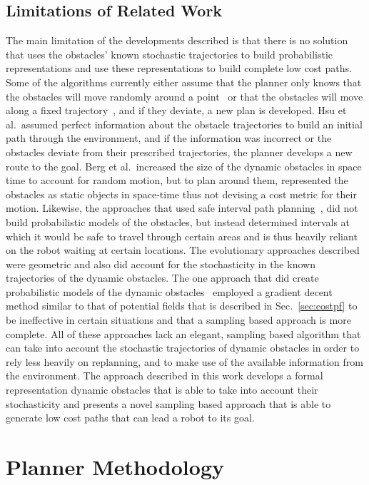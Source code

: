 \documentclass[letterpaper, 10pt, conference]{ieeeconf}
\begin{document}
\subsection{Limitations of Related Work}

The main limitation of the developments described is that there is no solution
that uses the obstacles' known stochastic trajectories to build probabilistic
representations and use these representations to build complete low cost paths.
Some of the algorithms currently either assume that the planner only knows that
the obstacles will move randomly around a point~\cite{rodriguez2007framework}
or that the obstacles will move along a fixed
trajectory~\cite{hsu2002randomized}, and if they deviate, a new plan is
developed. Hsu et al.\ assumed perfect information about the obstacle
trajectories to build an initial path through the environment, and if the
information was incorrect or the obstacles deviate from their prescribed
trajectories, the planner develops a new route to the goal. Berg et al.\
increased the size of the dynamic obstacles in space time to account for random
motion, but to plan around them, represented the obstacles as static objects in
space-time thus not devising a cost metric for their motion. Likewise, the
approaches that used safe interval path planning~\cite{asipp, sipp}, did not
build probabilistic models of the obstacles, but instead determined intervals
at which it would be safe to travel through certain areas and is thus heavily
reliant on the robot waiting at certain locations. The evolutionary approaches
described were geometric and also did account for the stochasticity in the
known trajectories of the dynamic obstacles. The one approach that did create
probabilistic models of the dynamic obstacles~\cite{jensen2003motion} employed
a gradient decent method similar to that of potential fields that is described
in Sec.~\ref{sec:costpf} to be ineffective in certain situations and that a
sampling based approach is more complete. All of these approaches lack an
elegant, sampling based algorithm that can take into account the stochastic
trajectories of dynamic obstacles in order to rely less heavily on replanning,
and to make use of the available information from the environment. The approach
described in this work develops a formal representation dynamic obstacles that
is able to take into account their stochasticity and presents a novel sampling
based approach that is able to generate low cost paths that can lead a robot to
its goal.

\section{Planner Methodology}
\end{document}
